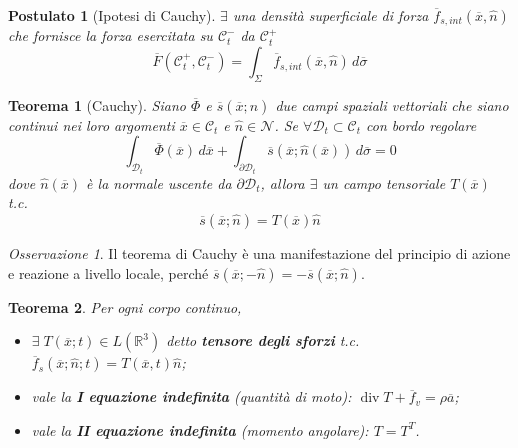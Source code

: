 \documentclass{book}
\theoremstyle{plain}
\newtheorem{teo}{Teorema}[chapter]
\theoremstyle{plain}
\theoremstyle{plain}
\newtheorem*{pos}{Postulato}
\theoremstyle{plain}
\theoremstyle{plain}
\theoremstyle{definition}
\theoremstyle{remark}
\newtheorem*{oss}{Osservazione}
\theoremstyle{definition}
\begin{document}
\begin{pos}[Ipotesi di Cauchy]
    $\exists$ una densità superficiale di forza $\overline{f}_{s,int}(\overline{x},\hat{n})$ che fornisce la forza esercitata su $\mathcal{C}_t^-$ da $\mathcal{C}_t^+$
    \begin{displaymath}
        \overline{F}(\mathcal{C}_t^+,\mathcal{C}_t^-)=\int_{\Sigma}\overline{f}_{s,int}(\overline{x},\hat{n})\,d\overline{\sigma}
    \end{displaymath}
\end{pos}

\begin{teo}[Cauchy]
    Siano $\overline{\Phi}$ e $\overline{s}(\overline{x};\hat{n})$ due campi spaziali vettoriali che siano continui nei loro argomenti $\overline{x}\in\mathcal{C}_t$ e $\hat{n}\in\mathcal{N}$. Se $\forall \mathcal{D}_t\subset\mathcal{C}_t$ con bordo regolare
    \begin{displaymath}
    \boxed{
        \int_{\mathcal{D}_t}\overline{\Phi}(\overline{x})\,d\overline{x} + \int_{\partial\mathcal{D}_t}\overline{s}(\overline{x};\hat{n}(\overline{x}))\,d\overline{\sigma}=0
        }
    \end{displaymath}
    dove $\hat{n}(\overline{x})$ è la normale uscente da $\partial \mathcal{D}_t$, allora $\exists$ un campo tensoriale $T(\overline{x})$ t.c.
    \begin{displaymath}
    \boxed{
    \overline{s}(\overline{x};\hat{n})=T(\overline{x})\hat{n}
    }
    \end{displaymath}
\end{teo}

\begin{oss}
    Il teorema di Cauchy è una manifestazione del principio di azione e reazione a livello locale, perché $\overline{s}(\overline{x};-\hat{n})=-\overline{s}(\overline{x};\hat{n})$.
\end{oss}

\begin{teo}
    Per ogni corpo continuo,
    \begin{itemize}
        \item $\exists \; T(\overline{x};t)\in L(\mathbb{R}^3)$ detto \textbf{tensore degli sforzi} t.c. $\overline{f}_s(\overline{x};\hat{n};t)=T(\overline{x},t)\hat{n}$;
        \item vale la \textbf{I equazione indefinita} (quantità di moto): $\operatorname{div}T + \overline{f}_v=\rho\overline{a}$;
        \item vale la \textbf{II equazione indefinita} (momento angolare): $T=T^T$.
    \end{itemize}
\end{teo}
\end{document}
